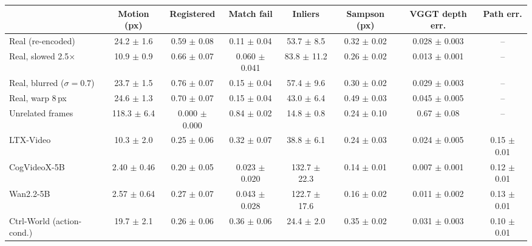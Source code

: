 \begin{tabular}{lccccccc}
\toprule
 & Motion (px) & Registered & Match fail & Inliers & Sampson (px) & VGGT depth err. & Path err. \\
\midrule
Real (re-encoded) & 24.2 $\pm$ 1.6 & 0.59 $\pm$ 0.08 & 0.11 $\pm$ 0.04 & 53.7 $\pm$ 8.5 & 0.32 $\pm$ 0.02 & 0.028 $\pm$ 0.003 & -- \\
Real, slowed 2.5$\times$ & 10.9 $\pm$ 0.9 & 0.66 $\pm$ 0.07 & 0.060 $\pm$ 0.041 & 83.8 $\pm$ 11.2 & 0.26 $\pm$ 0.02 & 0.013 $\pm$ 0.001 & -- \\
Real, blurred ($\sigma{=}0.7$) & 23.7 $\pm$ 1.5 & 0.76 $\pm$ 0.07 & 0.15 $\pm$ 0.04 & 57.4 $\pm$ 9.6 & 0.30 $\pm$ 0.02 & 0.029 $\pm$ 0.003 & -- \\
Real, warp 8\,px & 24.6 $\pm$ 1.3 & 0.70 $\pm$ 0.07 & 0.15 $\pm$ 0.04 & 43.0 $\pm$ 6.4 & 0.49 $\pm$ 0.03 & 0.045 $\pm$ 0.005 & -- \\
Unrelated frames & 118.3 $\pm$ 6.4 & 0.000 $\pm$ 0.000 & 0.84 $\pm$ 0.02 & 14.8 $\pm$ 0.8 & 0.24 $\pm$ 0.10 & 0.67 $\pm$ 0.08 & -- \\
\midrule
LTX-Video & 10.3 $\pm$ 2.0 & 0.25 $\pm$ 0.06 & 0.32 $\pm$ 0.07 & 38.8 $\pm$ 6.1 & 0.24 $\pm$ 0.03 & 0.024 $\pm$ 0.005 & 0.15 $\pm$ 0.01 \\
CogVideoX-5B & 2.40 $\pm$ 0.46 & 0.20 $\pm$ 0.05 & 0.023 $\pm$ 0.020 & 132.7 $\pm$ 22.3 & 0.14 $\pm$ 0.01 & 0.007 $\pm$ 0.001 & 0.12 $\pm$ 0.01 \\
Wan2.2-5B & 2.57 $\pm$ 0.64 & 0.27 $\pm$ 0.07 & 0.043 $\pm$ 0.028 & 122.7 $\pm$ 17.6 & 0.16 $\pm$ 0.02 & 0.011 $\pm$ 0.002 & 0.13 $\pm$ 0.01 \\
Ctrl-World (action-cond.) & 19.7 $\pm$ 2.1 & 0.26 $\pm$ 0.06 & 0.36 $\pm$ 0.06 & 24.4 $\pm$ 2.0 & 0.35 $\pm$ 0.02 & 0.031 $\pm$ 0.003 & 0.10 $\pm$ 0.01 \\
\bottomrule
\end{tabular}